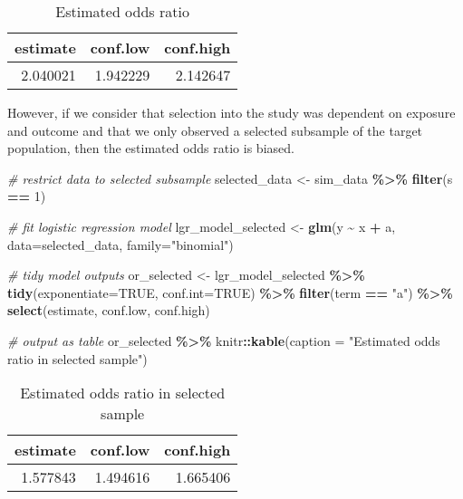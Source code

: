 \documentclass[
]{book}
\newenvironment{Shaded}{\begin{snugshade}}{\end{snugshade}}
\newcommand{\AttributeTok}[1]{\textcolor[rgb]{0.13,0.29,0.53}{#1}}
\newcommand{\CommentTok}[1]{\textcolor[rgb]{0.56,0.35,0.01}{\textit{#1}}}
\newcommand{\ConstantTok}[1]{\textcolor[rgb]{0.56,0.35,0.01}{#1}}
\newcommand{\DecValTok}[1]{\textcolor[rgb]{0.00,0.00,0.81}{#1}}
\newcommand{\FunctionTok}[1]{\textcolor[rgb]{0.13,0.29,0.53}{\textbf{#1}}}
\newcommand{\NormalTok}[1]{#1}
\newcommand{\OtherTok}[1]{\textcolor[rgb]{0.56,0.35,0.01}{#1}}
\newcommand{\SpecialCharTok}[1]{\textcolor[rgb]{0.81,0.36,0.00}{\textbf{#1}}}
\newcommand{\StringTok}[1]{\textcolor[rgb]{0.31,0.60,0.02}{#1}}
\begin{document}
\begin{table}

\caption{\label{tab:unnamed-chunk-7}Estimated odds ratio}
\centering
\begin{tabular}[t]{r|r|r}
\hline
estimate & conf.low & conf.high\\
\hline
2.040021 & 1.942229 & 2.142647\\
\hline
\end{tabular}
\end{table}

However, if we consider that selection into the study was dependent on exposure and outcome and that we only observed a selected subsample of the target population, then the estimated odds ratio is biased.

\begin{Shaded}
\begin{Highlighting}[]
\CommentTok{\# restrict data to selected subsample}
\NormalTok{selected\_data }\OtherTok{\textless{}{-}}\NormalTok{ sim\_data }\SpecialCharTok{\%\textgreater{}\%} \FunctionTok{filter}\NormalTok{(s }\SpecialCharTok{==} \DecValTok{1}\NormalTok{)}

\CommentTok{\# fit logistic regression model}
\NormalTok{lgr\_model\_selected }\OtherTok{\textless{}{-}} \FunctionTok{glm}\NormalTok{(y }\SpecialCharTok{\textasciitilde{}}\NormalTok{ x }\SpecialCharTok{+}\NormalTok{ a, }\AttributeTok{data=}\NormalTok{selected\_data, }\AttributeTok{family=}\StringTok{"binomial"}\NormalTok{) }

\CommentTok{\# tidy model outputs}
\NormalTok{or\_selected }\OtherTok{\textless{}{-}}\NormalTok{ lgr\_model\_selected }\SpecialCharTok{\%\textgreater{}\%} 
  \FunctionTok{tidy}\NormalTok{(}\AttributeTok{exponentiate=}\ConstantTok{TRUE}\NormalTok{, }\AttributeTok{conf.int=}\ConstantTok{TRUE}\NormalTok{) }\SpecialCharTok{\%\textgreater{}\%} 
  \FunctionTok{filter}\NormalTok{(term }\SpecialCharTok{==} \StringTok{"a"}\NormalTok{) }\SpecialCharTok{\%\textgreater{}\%} 
  \FunctionTok{select}\NormalTok{(estimate, conf.low, conf.high) }

\CommentTok{\# output as table}
\NormalTok{or\_selected }\SpecialCharTok{\%\textgreater{}\%}
\NormalTok{  knitr}\SpecialCharTok{::}\FunctionTok{kable}\NormalTok{(}\AttributeTok{caption =} \StringTok{"Estimated odds ratio in selected sample"}\NormalTok{)}
\end{Highlighting}
\end{Shaded}

\begin{table}

\caption{\label{tab:unnamed-chunk-8}Estimated odds ratio in selected sample}
\centering
\begin{tabular}[t]{r|r|r}
\hline
estimate & conf.low & conf.high\\
\hline
1.577843 & 1.494616 & 1.665406\\
\hline
\end{tabular}
\end{table}
\end{document}
